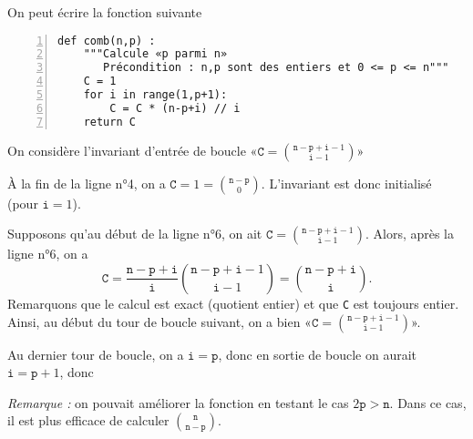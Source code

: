 \question{} On peut écrire la fonction suivante
\begin{Verbatim}[gobble=0,numbers=left]
def comb(n,p) :
    """Calcule «p parmi n»
       Précondition : n,p sont des entiers et 0 <= p <= n"""
    C = 1
    for i in range(1,p+1):
        C = C * (n-p+i) // i
    return C
\end{Verbatim}
\question{}
On considère l'invariant d'entrée de boucle «$\texttt{C} = \binom{\texttt n-\texttt p+\texttt i-1}{\texttt i-1}$»

À la fin de la  ligne n°4, on a $\texttt C = 1 = \binom{\texttt n-\texttt p}{0}$. L'invariant est donc initialisé (pour $\texttt i=1$).

Supposons qu'au début de la ligne n°6, on ait $\texttt{C} = \binom{\texttt n-\texttt p+\texttt i-1}{\texttt i-1}$. Alors, après la ligne n°6, on a 
\begin{equation*}
    \texttt C = \dfrac{\texttt n-\texttt p+\texttt i}{\texttt i}\binom{\texttt n-\texttt p+\texttt i-1}{\texttt i-1} = \binom{\texttt n-\texttt p+\texttt i}{\texttt i}.
\end{equation*}
Remarquons que le calcul est exact (quotient entier) et que \texttt C est toujours entier. 
Ainsi, au début du tour de boucle suivant, on a bien «$\texttt{C} = \binom{\texttt n-\texttt p+\texttt i-1}{\texttt i-1}$».

Au dernier tour de boucle, on a $\texttt i = \texttt p$, donc en sortie de boucle on aurait $\texttt i = \texttt p +1$, donc
\begin{center}
\end{center}

\emph{Remarque :} on pouvait améliorer la fonction en testant le cas $2\texttt p >\texttt n$. Dans ce cas, il est plus efficace de calculer $\binom{\texttt n}{\texttt n - \texttt p}$. 
